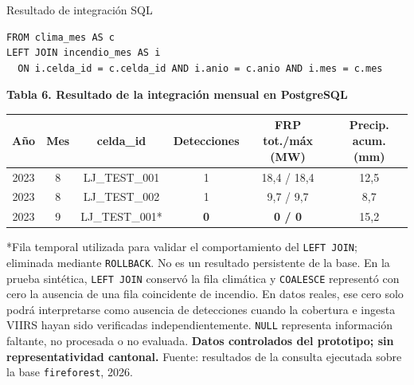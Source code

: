 \documentclass[aspectratio=169,11pt]{beamer}
\newcommand{\fuente}[1]{{\vfill\tiny\color{GrisTexto!70!black} Fuente: #1}}
\begin{document}
\begin{frame}[fragile]{Resultado de integraci\'on SQL}
  \begin{footnotesize}
  \begin{verbatim}
FROM clima_mes AS c
LEFT JOIN incendio_mes AS i
  ON i.celda_id = c.celda_id AND i.anio = c.anio AND i.mes = c.mes
  \end{verbatim}
  \end{footnotesize}
  \vspace{0.08cm}
  \raggedright{\small\textbf{Tabla 6. Resultado de la integraci\'on mensual en PostgreSQL}\par}
  \vspace{0.03cm}
  \tiny
  \setlength{\tabcolsep}{3pt}
  \begin{center}
  \begin{tabular}{@{}cccccc@{}}
  \toprule
  \textbf{A\~no} & \textbf{Mes} & \textbf{celda\_id} & \textbf{Detecciones} & \textbf{FRP tot./m\'ax (MW)} & \textbf{Precip. acum. (mm)} \\
  \midrule
  2023 & 8 & LJ\_TEST\_001 & 1 & 18,4 / 18,4 & 12,5 \\
  2023 & 8 & LJ\_TEST\_002 & 1 & 9,7 / 9,7 & 8,7 \\
  \midrule
  \rowcolor{Fuego!10}
  2023 & 9 & LJ\_TEST\_001* & \textbf{0} & \textbf{0 / 0} & 15,2 \\
  \bottomrule
  \end{tabular}
  \end{center}
  \vspace{0.1cm}
  {\scriptsize\color{Fuego} *Fila temporal utilizada para validar el comportamiento del \texttt{LEFT JOIN}; eliminada mediante \texttt{ROLLBACK}. No es un resultado persistente de la base.}
  \vspace{0.08cm}
  {\tiny En la prueba sint\'etica, \texttt{LEFT JOIN} conserv\'o la fila clim\'atica y \texttt{COALESCE} represent\'o con cero la ausencia de una fila coincidente de incendio. En datos reales, ese cero solo podr\'a interpretarse como ausencia de detecciones cuando la cobertura e ingesta VIIRS hayan sido verificadas independientemente. \texttt{NULL} representa informaci\'on faltante, no procesada o no evaluada.}
  \vspace{0.06cm}
  {\scriptsize\textbf{Datos controlados del prototipo; sin representatividad cantonal.}}
  \fuente{resultados de la consulta ejecutada sobre la base \texttt{fireforest}, 2026.}
\end{frame}
\end{document}
